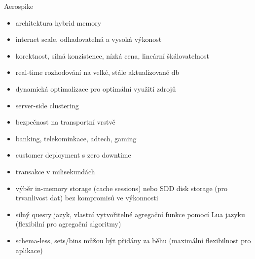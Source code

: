 \documentclass{article}
\begin{document}
	\begin{subsubsection}{Aerospike}
		\begin{itemize}
			\item architektura hybrid memory
			\item internet scale, odhadovatelná a vysoká výkonost
			\item korektnost, silná konzistence, nízká cena, lineární škálovatelnost
			\item real-time rozhodování na velké, stále aktualizované db
			\item dynamická optimalizace pro optimální využití zdrojů
			\item server-side clustering
			\item bezpečnost na transportní vrstvě
			\item banking, telekominkace, adtech, gaming
			\item customer deployment s zero downtime
			\item transakce v milisekundách
			\item výběr in-memory storage (cache sessions) nebo SDD disk storage (pro trvanlivost dat) bez kompromisů ve výkonnosti
			\item silný quesry jazyk, vlastní vytvořitelné agregační funkce pomocí Lua jazyku (flexibilní pro agregační algoritmy)
			\item schema-less, sets/bins můžou být přidány za běhu (maximální flexibilnost pro aplikace)
		\end{itemize}
	\end{subsubsection}
\end{document}
